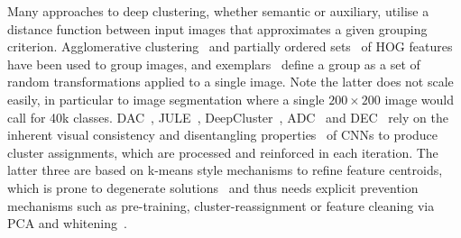 Many approaches to deep clustering, whether semantic or auxiliary, utilise a distance function between input images that approximates a given grouping criterion.
Agglomerative clustering~\cite{bautista2016cliquecnn} and partially ordered sets~\cite{bautista2017deep} of HOG features~\cite{dalal2005histograms} have been used to group images, and exemplars~\cite{dosovitskiy2015discriminative} define a group as a set of random transformations applied to a single image. Note the latter does not scale easily, in particular to image segmentation where a single $200\times 200$ image would call for 40k classes. DAC~\cite{chang2017deep}, JULE~\cite{yang2016joint}, DeepCluster~\cite{caron2018deep}, ADC~\cite{haeusser2018associative} and DEC~\cite{xie2016unsupervised} rely on the inherent visual consistency and disentangling properties~\cite{greff2015binding} of CNNs to produce cluster assignments, which are processed and reinforced in each iteration. 
The latter three are based on k-means style mechanisms to refine feature centroids, which is prone to degenerate solutions~\cite{caron2018deep} and thus needs explicit prevention mechanisms such as pre-training, cluster-reassignment or feature cleaning via PCA and whitening~\cite{xie2016unsupervised, caron2018deep}.

\begin{comment}
DAC is the only unsupervised clustering algorithm out of these that eschews k-means and agglomerative clustering for a different but similar clustering scheme, based on feature inner-products rather than distances.
DAC forms clusters gradually, in a self-paced manner, thus alleviating but not eliminating the risk of incurring degenerate solutions.
Furthermore, the nature of the optimisation, which reinforces bootstrapped class labels, creates a strong dependency on initialisation.

For unsupervised feature learning in general, i.e.\ where the training objective is not clustering, a large number of works explore using proxy learning tasks. 
There are two major directions:  generative tasks such as autoencoder image reconstruction~\cite{vincent2010stacked}, and spatial-temporal order or context prediction~\cite{lee2017unsupervised,cruz2017deeppermnet,doersch2015unsupervised}. The latter includes predicting patch proximity~\cite{isola2015learning}, solving jigsaw puzzles~\cite{noroozi2016unsupervised} and inpainting~\cite{pathak2016context}. 
In many cases they benefit from principled formulations that protect against degeneracy.
However, unlike the aforementioned clustering methods, the features learned by these methods need to be post-processed, for example using k-means, to cluster the data. 

\end{comment}

